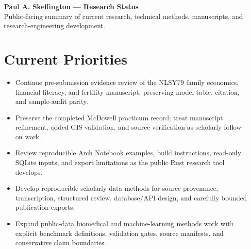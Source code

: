 \documentclass[10.5pt,letterpaper]{article}
\begin{document}
{\LARGE \textbf{Paul A. Skeffington --- Research Status}}\\[-1pt]
{\small Public-facing summary of current research, technical methods, manuscripts, and research-engineering development.}\\[6pt]





\section*{Current Priorities}
\begin{itemize}
    \item Continue pre-submission evidence review of the NLSY79 family economics, financial literacy, and fertility manuscript, preserving model-table, citation, and sample-audit parity.
    \item Preserve the completed McDowell practicum record; treat manuscript refinement, added GIS validation, and source verification as scholarly follow-on work.
    \item Review reproducible Arch Notebook examples, build instructions, read-only SQLite inputs, and export limitations as the public Rust research tool develops.
    \item Develop reproducible scholarly-data methods for source provenance, transcription, structured review, database/API design, and carefully bounded publication exports.
    \item Expand public-data biomedical and machine-learning methods work with explicit benchmark definitions, validation gates, source manifests, and conservative claim boundaries.
\end{itemize}
\end{document}
